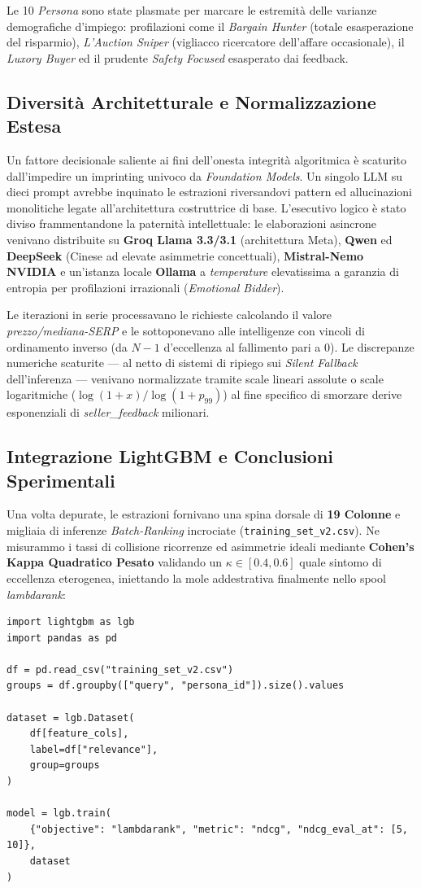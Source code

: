 Le 10 \textit{Persona} sono state plasmate per marcare le estremità delle varianze demografiche d'impiego: profilazioni come il \textit{Bargain Hunter} (totale esasperazione del risparmio), \textit{L'Auction Sniper} (vigliacco ricercatore dell'affare occasionale), il \textit{Luxory Buyer} ed il prudente \textit{Safety Focused} esasperato dai feedback.

\subsection{Diversità Architetturale e Normalizzazione Estesa}
Un fattore decisionale saliente ai fini dell'onesta integrità algoritmica è scaturito dall'impedire un imprinting univoco da \emph{Foundation Models}. Un singolo LLM su dieci prompt avrebbe inquinato le estrazioni riversandovi pattern ed allucinazioni monolitiche legate all'architettura costruttrice di base. L'esecutivo logico è stato diviso frammentandone la paternità intellettuale: le elaborazioni asincrone venivano distribuite su \textbf{Groq Llama 3.3/3.1} (architettura Meta), \textbf{Qwen} ed \textbf{DeepSeek} (Cinese ad elevate asimmetrie concettuali), \textbf{Mistral-Nemo NVIDIA} e un'istanza locale \textbf{Ollama} a \textit{temperature} elevatissima a garanzia di entropia per profilazioni irrazionali (\emph{Emotional Bidder}).

Le iterazioni in serie processavano le richieste calcolando il valore \textit{prezzo/mediana-SERP} e le sottoponevano alle intelligenze con vincoli di ordinamento inverso (da $N-1$ d'eccellenza al fallimento pari a \(0\)). Le discrepanze numeriche scaturite — al netto di sistemi di ripiego sui \textit{Silent Fallback} dell'inferenza — venivano normalizzate tramite scale lineari assolute o scale logaritmiche (\(\log(1+x)/\log(1+p_{99})\)) al fine specifico di smorzare derive esponenziali di \textit{seller_feedback} milionari. 

\subsection{Integrazione LightGBM e Conclusioni Sperimentali}
Una volta depurate, le estrazioni fornivano una spina dorsale di \textbf{19 Colonne} e migliaia di inferenze \textit{Batch-Ranking} incrociate (\texttt{training\_set\_v2.csv}). Ne misurammo i tassi di collisione ricorrenze ed asimmetrie ideali mediante \textbf{Cohen's Kappa Quadratico Pesato} validando un \(\kappa \in [0.4, 0.6]\) quale sintomo di eccellenza eterogenea, iniettando la mole addestrativa finalmente nello spool \textit{lambdarank}:
\begin{verbatim}
import lightgbm as lgb
import pandas as pd

df = pd.read_csv("training_set_v2.csv")
groups = df.groupby(["query", "persona_id"]).size().values

dataset = lgb.Dataset(
    df[feature_cols],
    label=df["relevance"],
    group=groups
)

model = lgb.train(
    {"objective": "lambdarank", "metric": "ndcg", "ndcg_eval_at": [5, 10]},
    dataset
)
\end{verbatim}

